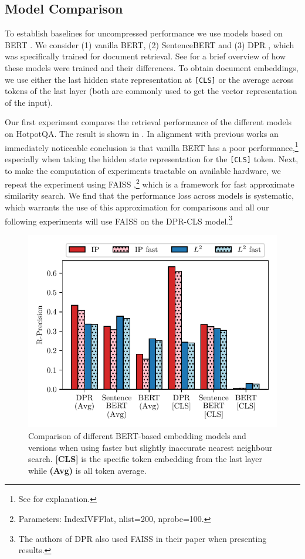 \subsection{Model Comparison}

To establish baselines for uncompressed performance we use models based on BERT \citep{devlin2019bert}.
We consider (1) vanilla BERT, (2) SentenceBERT \citep{reimers2019sentence} and (3) DPR \citep{karpukhin2020dense}, which was specifically trained for document retrieval.
See  for a brief overview of how these models were trained and their differences.
To obtain document embeddings, we use either the last hidden state representation at \texttt{[CLS]} or the average across tokens of the last layer (both are commonly used to get the vector representation of the input).

Our first experiment compares the retrieval performance of the different models on HotpotQA.
The result is shown in .
In alignment with previous works \citep{reimers2019sentence} an immediately noticeable conclusion is that vanilla BERT has a poor performance,\footnote{See  for explanation.} especially when taking the hidden state representation for the \texttt{[CLS]} token.
Next, to make the computation of experiments tractable on available hardware, we repeat the experiment using FAISS \citep{JDH17},\footnote{Parameters: {IndexIVFFlat, nlist=200, nprobe=100}.} which is a framework for fast approximate similarity search.
We find that the performance loss across models is systematic, which warrants the use of this approximation for comparisons and all our following experiments will use FAISS on the DPR-CLS model.\footnote{The authors of DPR also used FAISS in their paper when presenting results.}

\begin{figure}[ht]
    \center
    \includegraphics[width=0.7\linewidth]{img/model_intro.pdf}

    \captionsetup{type=figure}\caption{Comparison of different BERT-based embedding models and versions when using faster but slightly inaccurate nearest neighbour search. \textbf{[CLS]} is the specific token embedding from the last layer while \textbf{(Avg)} is all token average.}
    \label{fig:model_intro}
\end{figure}

